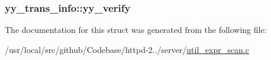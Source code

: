 \subsubsection[{\texorpdfstring{yy\+\_\+verify}{yy_verify}}]{ yy\+\_\+trans\+\_\+info\+::yy\+\_\+verify}\hypertarget{structyy__trans__info_a5c9f61e770deef50bd4e697310342fe9}{}\label{structyy__trans__info_a5c9f61e770deef50bd4e697310342fe9}


The documentation for this struct was generated from the following file\+:\begin{DoxyCompactItemize}
\item 
/usr/local/src/github/\+Codebase/httpd-\/2../server/\hyperlink{util__expr__scan_8c}{util\+\_\+expr\+\_\+scan.\+c}\end{DoxyCompactItemize}

